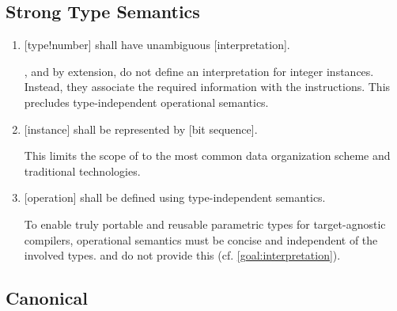 \subsection{Strong Type Semantics}

\begin{enumerate}
    \item[\Goal{goal:interpretation}] [type!number] shall have unambiguous [interpretation].

    \begin{highlight}{}
        \LLVMIR, and \arith by extension, do not define an interpretation for integer instances.
        Instead, they associate the required information with the instructions.
        This precludes type-independent operational semantics.
    \end{highlight}

    \item[\Goal{goal:bits}] [instance] shall be represented by [bit sequence].

    \begin{highlight}{}
        This limits the scope of \basetwo to the most common data organization scheme and traditional technologies.
    \end{highlight}

    \item[\Goal{goal:untyped_ops}] [operation] shall be defined using type-independent semantics.

    \begin{highlight}{}
        To enable truly portable and reusable parametric types for target-agnostic compilers, operational semantics must be concise and independent of the involved types.
        \LLVMIR and \arith do not provide this (cf. \cref{goal:interpretation}).
    \end{highlight}
\end{enumerate}

\subsection{Canonical }

